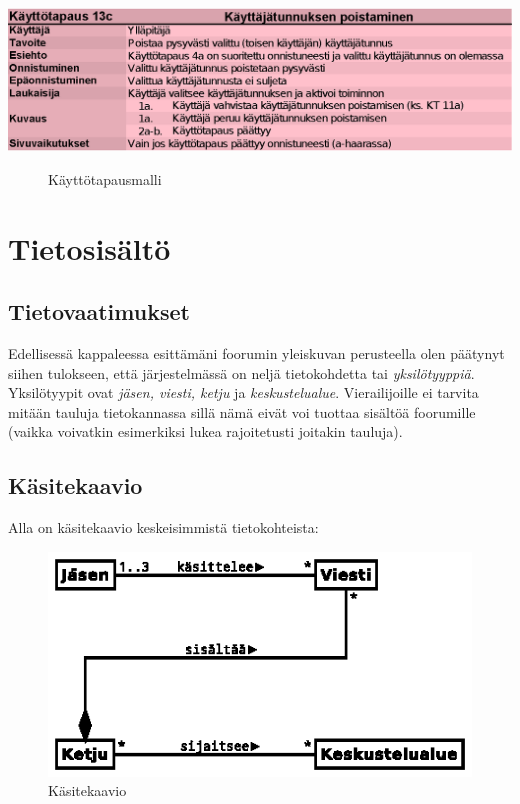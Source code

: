 \documentclass[11pt]{article}
\begin{document}
		\includegraphics[trim = 21mm 0mm 0mm 25mm]{kayttotapausmalli-sivu-9.eps}\\
		
		\begin{figure}
			\caption{Käyttötapausmalli}
		\end{figure}

\newpage
\thispagestyle{plain}
\section{Tietosisältö}
	\subsection{Tietovaatimukset}
		Edellisessä kappaleessa esittämäni foorumin yleiskuvan perusteella olen päätynyt siihen tulokseen,
		että järjestelmässä on neljä tietokohdetta tai \emph{yksilötyyppiä}. Yksilötyypit ovat
		\emph{jäsen, viesti, ketju} ja \emph{keskustelualue}. Vierailijoille ei tarvita mitään tauluja
		tietokannassa sillä nämä eivät voi tuottaa sisältöä foorumille (vaikka voivatkin esimerkiksi lukea
		rajoitetusti joitakin tauluja).		
		
	\subsection{Käsitekaavio} Alla on käsitekaavio keskeisimmistä tietokohteista:
		\begin{figure}[H]		
			\includegraphics[trim = 0mm 0mm 0mm -3mm, scale = 2.0]{kasitekaavio.eps}
			\caption{Käsitekaavio}
		\end{figure}	
		
\end{document}
